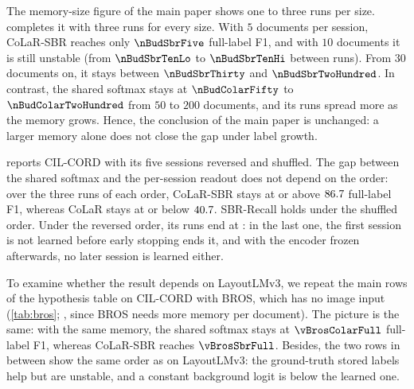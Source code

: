  The memory-size figure of the main paper shows one to three runs per size.  completes it with three runs for every size. With $5$ documents per session, CoLaR-SBR reaches only $\nBudSbrFive$ full-label F1, and with $10$ documents it is still unstable (from $\nBudSbrTenLo$ to $\nBudSbrTenHi$ between runs). From $30$ documents on, it stays between $\nBudSbrThirty$ and $\nBudSbrTwoHundred$. In contrast, the shared softmax stays at $\nBudColarFifty$ to $\nBudColarTwoHundred$ from $50$ to $200$ documents, and its runs spread more as the memory grows. Hence, the conclusion of the main paper is unchanged: a larger memory alone does not close the gap under label growth.

\begin{table}[t]
\centering\small
\setlength{\tabcolsep}{5pt}
\caption{\textbf{Session order} on CIL-CORD (full-label F1; mean $\pm$ s.d.\ of three runs).}
\label{tab:order}

\end{table}

\begin{table}[t]
\centering\small
\setlength{\tabcolsep}{5pt}
\caption{\textbf{A second backbone}: BROS on CIL-CORD (mean $\pm$ s.d.\ of three runs). $^{r}$Uses the ground-truth labels.}
\label{tab:bros}
\resizebox{\linewidth}{!}{}
\end{table}

\begin{table}[t]
\centering\small
\setlength{\tabcolsep}{5pt}
\caption{\textbf{Patience of the baselines} on CIL-FUNSD (AA; mean $\pm$ s.d.\ of three runs; ``--'': not run).}
\label{tab:patience}

\end{table}

  reports CIL-CORD with its five sessions reversed and shuffled. The gap between the shared softmax and the per-session readout does not depend on the order: over the three runs of each order, CoLaR-SBR stays at or above $86.7$ full-label F1, whereas CoLaR stays at or below $40.7$. SBR-Recall holds under the shuffled order. Under the reversed order, its runs end at \nOrderRevRecallRuns: in the last one, the first session is not learned before early stopping ends it, and with the encoder frozen afterwards, no later session is learned either.

 To examine whether the result depends on LayoutLMv3, we repeat the main rows of the hypothesis table on CIL-CORD with BROS, which has no image input (\cref{tab:bros}; \nBrosRecipe, since BROS needs more memory per document). The picture is the same: with the same memory, the shared softmax stays at $\vBrosColarFull$ full-label F1, whereas CoLaR-SBR reaches $\vBrosSbrFull$. Besides, the two rows in between show the same order as on LayoutLMv3: the ground-truth stored labels help but are unstable, and a constant background logit is below the learned one.

